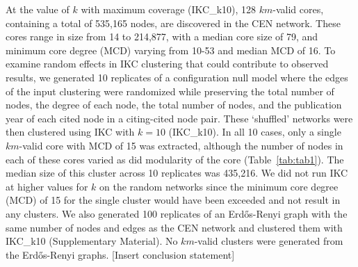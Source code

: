 \documentclass[11pt, oneside]{article}   	%
\begin{document}
At the value of $k$ with maximum coverage (IKC\_k10), 128 $km$-valid cores, containing a total of 535,165 nodes, are discovered in the CEN network. These cores range in size from 14 to 214,877, with a median core size of 79, and minimum core degree (MCD) varying from 10-53 and median MCD of 16. To examine random effects in IKC clustering that could contribute to observed results, we generated 10 replicates of a configuration null model where the edges of the input clustering were randomized while preserving the total number of nodes, the degree of each node, the total number of nodes, and the publication year of each cited node in a citing-cited node pair. These `shuffled' networks were then clustered using IKC with  $k=10$ (IKC\_k10). In all 10 cases, only a single $km$-valid core with MCD of 15 was extracted, although the number of nodes in each of these cores varied as did modularity of the core (Table~\ref{tab:tab1}). The median size of this cluster across 10 replicates was 435,216. We did not run IKC at higher values for $k$ on the random networks since  the minimum core degree (MCD) of 15 for the single cluster would have been exceeded and not result in any clusters. We also generated 100 replicates of an Erd\H{o}s-Renyi graph with the same number of nodes and edges as the CEN network and clustered them with IKC\_k10 (Supplementary Material). No $km$-valid clusters were generated from the Erd\H{o}s-Renyi graphs. [Insert conclusion statement]


\end{document}
